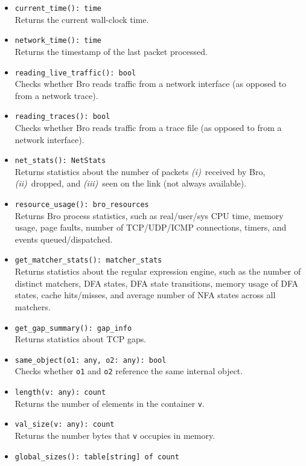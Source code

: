 \documentclass[10pt,landscape]{article}
\def\first{\emph{(i)}~}
\def\second{\emph{(ii)}~}
\def\third{\emph{(iii)}~}
\begin{document}
\begin{multicols*}{2}
\begin{itemize}
  \item \verb|current_time(): time|\\
    Returns the current wall-clock time.
  \item \verb|network_time(): time|\\
    Returns the timestamp of the last packet processed.
  \item \verb|reading_live_traffic(): bool|\\
    Checks whether Bro reads traffic from a network interface (as opposed to
    from a network trace).
  \item \verb|reading_traces(): bool|\\
    Checks whether Bro reads traffic from a trace file (as opposed to
    from a network interface).
  \item \verb|net_stats(): NetStats|\\
    Returns statistics about the number of packets
    \first received by Bro,
    \second dropped,
    and \third seen on the link (not always available).
  \item \verb|resource_usage(): bro_resources|\\
    Returns Bro process statistics, such as real/user/sys CPU time, memory
    usage, page faults, number of TCP/UDP/ICMP connections, timers, and events
    queued/dispatched.
  \item \verb|get_matcher_stats(): matcher_stats|\\
    Returns statistics about the regular expression engine, such as the number
    of distinct matchers, DFA states, DFA state transitions, memory usage of
    DFA states, cache hits/misses, and average number of NFA states across all
    matchers.
  \item \verb|get_gap_summary(): gap_info|\\
    Returns statistics about TCP gaps.
  \item \verb|same_object(o1: any, o2: any): bool|\\
    Checks whether \texttt{o1} and \texttt{o2} reference the same internal
    object.
  \item \verb|length(v: any): count|\\
    Returns the number of elements in the container \texttt{v}.
  \item \verb|val_size(v: any): count|\\
    Returns the number bytes that \texttt{v} occupies in memory.
  \item \verb|global_sizes(): table[string] of count|\\

\end{itemize}
\end{multicols*}
\end{document}
